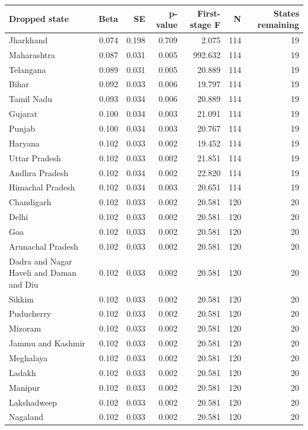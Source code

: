 \begin{tabular}{lrrrrrr}
\toprule
Dropped state & Beta & SE & p-value & First-stage F & N & States remaining \\
\midrule
Jharkhand & 0.074 & 0.198 & 0.709 & 2.075 & 114 & 19 \\
Maharashtra & 0.087 & 0.031 & 0.005 & 992.632 & 114 & 19 \\
Telangana & 0.089 & 0.031 & 0.005 & 20.889 & 114 & 19 \\
Bihar & 0.092 & 0.033 & 0.006 & 19.797 & 114 & 19 \\
Tamil Nadu & 0.093 & 0.034 & 0.006 & 20.889 & 114 & 19 \\
Gujarat & 0.100 & 0.034 & 0.003 & 21.091 & 114 & 19 \\
Punjab & 0.100 & 0.034 & 0.003 & 20.767 & 114 & 19 \\
Haryana & 0.102 & 0.033 & 0.002 & 19.452 & 114 & 19 \\
Uttar Pradesh & 0.102 & 0.033 & 0.002 & 21.851 & 114 & 19 \\
Andhra Pradesh & 0.102 & 0.034 & 0.002 & 22.820 & 114 & 19 \\
Himachal Pradesh & 0.102 & 0.034 & 0.003 & 20.651 & 114 & 19 \\
Chandigarh & 0.102 & 0.033 & 0.002 & 20.581 & 120 & 20 \\
Delhi & 0.102 & 0.033 & 0.002 & 20.581 & 120 & 20 \\
Goa & 0.102 & 0.033 & 0.002 & 20.581 & 120 & 20 \\
Arunachal Pradesh & 0.102 & 0.033 & 0.002 & 20.581 & 120 & 20 \\
Dadra and Nagar Haveli and Daman and Diu & 0.102 & 0.033 & 0.002 & 20.581 & 120 & 20 \\
Sikkim & 0.102 & 0.033 & 0.002 & 20.581 & 120 & 20 \\
Puducherry & 0.102 & 0.033 & 0.002 & 20.581 & 120 & 20 \\
Mizoram & 0.102 & 0.033 & 0.002 & 20.581 & 120 & 20 \\
Jammu and Kashmir & 0.102 & 0.033 & 0.002 & 20.581 & 120 & 20 \\
Meghalaya & 0.102 & 0.033 & 0.002 & 20.581 & 120 & 20 \\
Ladakh & 0.102 & 0.033 & 0.002 & 20.581 & 120 & 20 \\
Manipur & 0.102 & 0.033 & 0.002 & 20.581 & 120 & 20 \\
Lakshadweep & 0.102 & 0.033 & 0.002 & 20.581 & 120 & 20 \\
Nagaland & 0.102 & 0.033 & 0.002 & 20.581 & 120 & 20 \\

\end{tabular}
